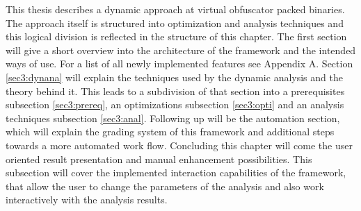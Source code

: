 \documentclass[10pt,twoside,a4paper,bibliography=totoc]{scrbook}
\begin{document}
This thesis describes a dynamic approach at virtual obfuscator packed binaries. The approach itself is structured into optimization and analysis techniques and this logical division is reflected in the structure of this chapter.
The first section will give a short overview into the architecture of the framework and the intended ways of use. For a list of all newly implemented features see Appendix A.
Section \ref{sec3:dynana} will explain the techniques used by the dynamic analysis and the theory behind it. This leads to a subdivision of that section into a prerequisites subsection \ref{sec3:prereq}, an optimizations subsection \ref{sec3:opti} and an analysis techniques subsection \ref{sec3:anal}.
Following up will be the automation section, which will explain the grading system of this framework and additional steps towards a more automated work flow.
Concluding this chapter will come the user oriented result presentation and manual enhancement possibilities. This subsection will cover the implemented interaction capabilities of the framework, that allow the user to change the parameters of the analysis and also work interactively with the analysis results.
 
\end{document}
